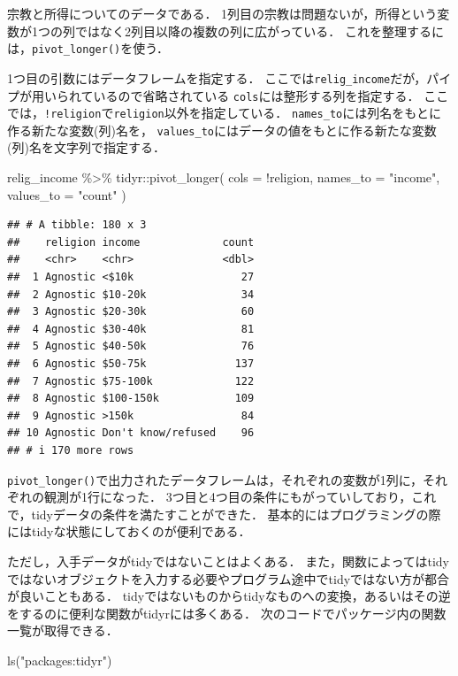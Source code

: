\documentclass[
]{article}
\newenvironment{Shaded}{\begin{snugshade}}{\end{snugshade}}
\newcommand{\AttributeTok}[1]{\textcolor[rgb]{0.77,0.63,0.00}{#1}}
\newcommand{\FunctionTok}[1]{\textcolor[rgb]{0.00,0.00,0.00}{#1}}
\newcommand{\NormalTok}[1]{#1}
\newcommand{\SpecialCharTok}[1]{\textcolor[rgb]{0.00,0.00,0.00}{#1}}
\newcommand{\StringTok}[1]{\textcolor[rgb]{0.31,0.60,0.02}{#1}}
\begin{document}
宗教と所得についてのデータである．
1列目の宗教は問題ないが，所得という変数が1つの列ではなく2列目以降の複数の列に広がっている．
これを整理するには，\texttt{pivot\_longer()}を使う．

1つ目の引数にはデータフレームを指定する．
ここでは\texttt{relig\_income}だが，パイプが用いられているので省略されている
\texttt{cols}には整形する列を指定する．
ここでは，\texttt{!religion}で\texttt{religion}以外を指定している．
\texttt{names\_to}には列名をもとに作る新たな変数(列)名を，
\texttt{values\_to}にはデータの値をもとに作る新たな変数(列)名を文字列で指定する．

\begin{Shaded}
\begin{Highlighting}[]
\NormalTok{relig\_income }\SpecialCharTok{\%\textgreater{}\%} 
\NormalTok{  tidyr}\SpecialCharTok{::}\FunctionTok{pivot\_longer}\NormalTok{(}
    \AttributeTok{cols =} \SpecialCharTok{!}\NormalTok{religion, }
    \AttributeTok{names\_to =} \StringTok{"income"}\NormalTok{, }
    \AttributeTok{values\_to =} \StringTok{"count"}
\NormalTok{  )}
\end{Highlighting}
\end{Shaded}

\begin{verbatim}
## # A tibble: 180 x 3
##    religion income             count
##    <chr>    <chr>              <dbl>
##  1 Agnostic <$10k                 27
##  2 Agnostic $10-20k               34
##  3 Agnostic $20-30k               60
##  4 Agnostic $30-40k               81
##  5 Agnostic $40-50k               76
##  6 Agnostic $50-75k              137
##  7 Agnostic $75-100k             122
##  8 Agnostic $100-150k            109
##  9 Agnostic >150k                 84
## 10 Agnostic Don't know/refused    96
## # i 170 more rows
\end{verbatim}

\texttt{pivot\_longer()}で出力されたデータフレームは，それぞれの変数が1列に，それぞれの観測が1行になった．
3つ目と4つ目の条件にもがっていしており，これで，tidyデータの条件を満たすことができた．
基本的にはプログラミングの際にはtidyな状態にしておくのが便利である．

ただし，入手データがtidyではないことはよくある．
また，関数によってはtidyではないオブジェクトを入力する必要やプログラム途中でtidyではない方が都合が良いこともある．
tidyではないものからtidyなものへの変換，あるいはその逆をするのに便利な関数がtidyrには多くある．
次のコードでパッケージ内の関数一覧が取得できる．

\begin{Shaded}
\begin{Highlighting}[]
\FunctionTok{ls}\NormalTok{(}\StringTok{"packages:tidyr"}\NormalTok{)}
\end{Highlighting}
\end{Shaded}
\end{document}
